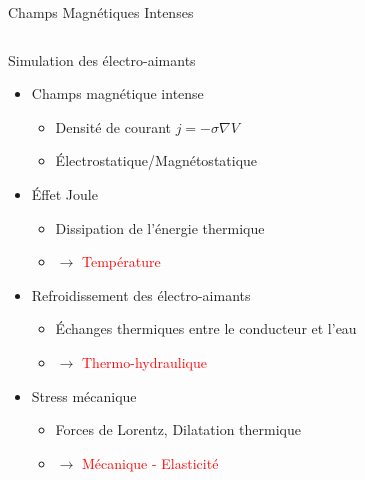 \begin{frame}{Champs Magnétiques Intenses}
  \vspace*{-0.5cm}
  \begin{columns}[c]
    \begin{column}{.7\linewidth}

      \begin{block}{Simulation des électro-aimants}
        \begin{itemize}
        \item Champs magnétique intense
          \begin{itemize}
          \item Densité de courant $j=-\sigma \nabla V$
          \item Électrostatique/Magnétostatique
          \end{itemize}

        \item Éffet Joule
          \begin{itemize}
          \item Dissipation de l'énergie thermique
          \item $\rightarrow$ \textcolor{red}{Température} \\
          \end{itemize}

        \item Refroidissement des électro-aimants
          \begin{itemize}
          \item Échanges thermiques entre le conducteur et l'eau
          \item $\rightarrow$ \textcolor{red}{Thermo-hydraulique } \\
          \end{itemize}

        \item Stress mécanique
          \begin{itemize}
          \item Forces de Lorentz, Dilatation thermique
          \item $\rightarrow$ \textcolor{red}{Mécanique - Elasticité} \\
          \end{itemize}
        \end{itemize}
      \end{block}


\end{column}
\end{columns}
\end{frame}
